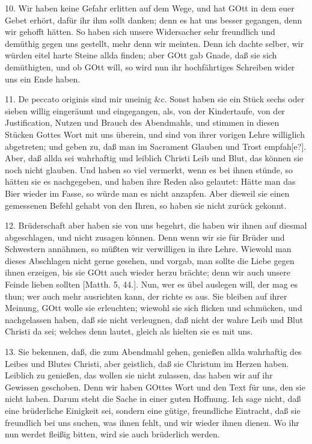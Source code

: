 10. Wir haben keine Gefahr erlitten auf dem Wege, und hat GOtt in dem euer Gebet erhört, dafür ihr ihm sollt danken; denn es hat uns besser gegangen, denn wir gehofft hätten. So haben sich unsere Widersacher sehr freundlich und demüthig gegen uns gestellt, mehr denn wir meinten. Denn ich dachte selber, wir würden eitel harte Steine allda finden; aber GOtt gab Gnade, daß sie sich demüthigten, und ob GOtt will, so wird nun ihr hochfährtiges Schreiben wider uns ein Ende haben.

11. De peccato originis sind mir uneinig \&c. Sonst haben sie ein Stück sechs oder sieben willig eingeräumt und eingegangen, als, von
der Kindertaufe, von der Justification, Nutzen und Brauch des Abendmahls, und stimmen in diesen Stücken Gottes Wort mit uns überein, und sind von ihrer vorigen Lehre williglich abgetreten; und geben zu, daß man im Sacrament Glauben und Trost empfah[e?]. Aber, daß allda sei wahrhaftig und leiblich Christi Leib und Blut, das können sie noch nicht glauben. Und haben so viel vermerkt, wenn es bei ihnen stünde, so hätten sie es nachgegeben, und haben ihre Reden also gelautet: Hätte man das Bier wieder im Fasse, so würde man es nicht anzapfen. Aber dieweil sie einen gemessenen Befehl gehabt von den Ihren, so haben sie nicht zurück gekonnt.

12. Brüderschaft aber haben sie von uns begehrt, die haben wir ihnen auf diesmal abgeschlagen, und nicht zusagen können. Denn wenn wir sie für Brüder und Schwestern annähmen, so müßten wir verwilligen in ihre Lehre. Wiewohl man dieses Abschlagen nicht gerne gesehen, und vorgab, man sollte die Liebe gegen ihnen erzeigen, bis sie GOtt auch wieder herzu brächte; denn wir auch unsere Feinde lieben sollten [Matth. 5, 44.]. Nun, wer es übel auslegen will, der mag es thun; wer auch mehr ausrichten kann, der richte es aus. Sie bleiben auf ihrer Meinung, GOtt wolle sie erleuchten; wiewohl sie sich flicken und schmücken, und nachgelassen haben, daß sie nicht verleugnen, daß nicht der wahre Leib und Blut Christi da sei; welches denn lautet, gleich als hielten sie es mit uns.

13. Sie bekennen, daß, die zum Abendmahl gehen, genießen allda wahrhaftig des Leibes und Blutes Christi, aber geistlich, daß sie Christum im Herzen haben. Leiblich zu genießen, das wollen sie nicht zulassen, das haben wir auf ihr Gewissen geschoben. Denn wir haben GOttes Wort und den Text für uns, den sie nicht haben. Darum steht die Sache in einer guten Hoffnung. Ich sage nicht, daß eine brüderliche Einigkeit sei, sondern eine gütige, freundliche Eintracht, daß sie freundlich bei uns suchen, was ihnen fehlt, und wir wieder ihnen dienen. Wo ihr nun werdet fleißig bitten, wird sie auch brüderlich werden.

